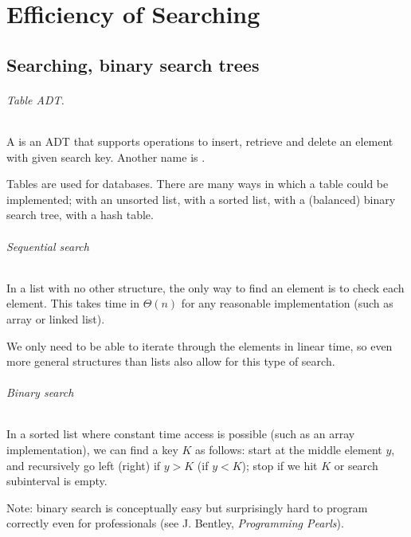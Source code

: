 \part{Efficiency of Searching}  
\label{ch:effsearch}

\chapter{Searching, binary search trees} %

\paragraph{Table ADT.}
\begin{Definition}
A  is an ADT that supports operations to insert, retrieve and delete an element
with given search key.  Another name is .
\end{Definition}
Tables are used for databases. There are  many ways in which a table could be implemented;
with an unsorted list, with a sorted list, with a (balanced) binary search tree, with a hash table.

\paragraph{Sequential search}

In a list with no other structure, the only way to find an element is to 
check each element. 
This takes time in $\Theta(n)$ for any reasonable implementation (such as 
array or linked list).

We only need to be able to iterate through the elements in linear time, so
 even more general structures than lists also allow for this type of search.


\paragraph{Binary search}

In a sorted list where constant time access is possible 
(such as an array implementation), we can find a key $K$ as follows: start at the middle element $y$, and recursively go left (right) if $y>K$ (if $y<K$);
 stop if we hit  $K$ or search subinterval is empty.

Note: binary search is conceptually easy but surprisingly hard to program
 correctly even for professionals (see J. Bentley, \emph{Programming Pearls}).

